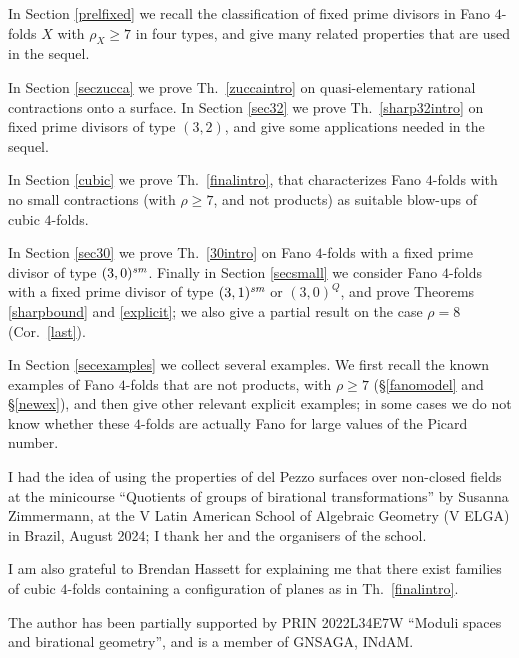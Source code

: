 \documentclass[a4paper,12pt]{amsart}
\theoremstyle{definition}
\numberwithin{figure}{section}
\numberwithin{table}{section}
\newcommand{\sm}{\text{\it sm}}
\begin{document}
 In Section \ref{prelfixed} we recall the classification of fixed prime divisors in Fano $4$-folds $X$ with 
 $\rho_X\geq 7$ in four types, and give many related properties that are used in the sequel.

 In Section \ref{seczucca} we prove Th.~\ref{zuccaintro} on quasi-elementary rational contractions onto a surface. In Section \ref{sec32} we prove Th.~\ref{sharp32intro} on fixed prime divisors of type $(3,2)$, and give some applications needed in the sequel.

 In Section \ref{cubic} 
  we prove 
  Th.~\ref{finalintro}, that characterizes Fano $4$-folds with no small contractions (with $\rho\geq 7$, and not products) as suitable blow-ups of cubic $4$-folds.

  In Section \ref{sec30} we prove
  Th.~\ref{30intro} on Fano $4$-folds with a fixed prime divisor of type $(3,0)^{\sm}$. Finally
in
 Section \ref{secsmall} we consider Fano $4$-folds with a fixed prime divisor of type $(3,1)^{\sm}$ or $(3,0)^Q$, and prove Theorems \ref{sharpbound} and \ref{explicit}; we also give a partial result on the case $\rho=8$ (Cor.~\ref{last}).

In Section \ref{secexamples} we collect several examples. We first recall the known examples of Fano $4$-folds that are not products, with $\rho\geq 7$ (\S\ref{fanomodel} and \S\ref{newex}), and then give other relevant explicit examples; in some cases we do not know whether these $4$-folds are actually Fano for large values of the Picard number.

\medskip

{\small {}
I had the idea of using the properties of del Pezzo surfaces over non-closed fields at
the minicourse  ``Quotients of groups of birational transformations'' by Susanna Zimmermann, at the V Latin American School of Algebraic Geometry (V ELGA) in Brazil, August 2024;
I thank her and the organisers of the school.

I am also grateful to Brendan Hassett for explaining me that there exist families of cubic $4$-folds containing a configuration of planes as in Th.~\ref{finalintro}.

The author has been partially supported by PRIN 2022L34E7W ``Moduli spaces and birational geometry'', and is a member of GNSAGA, INdAM.}
 
{\small\tableofcontents}
    
\end{document}

